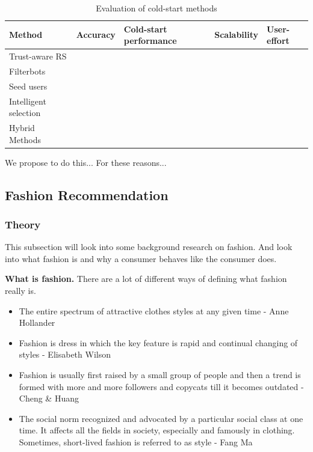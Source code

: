 \begin{table}[H]
    \centering
    \begin{tabular}{|l|l|l|l|l|}
    \hline
	Method & Accuracy & Cold-start performance & Scalability & User-effort \\ \hline
	Trust-aware RS & & & \\ \hline
	Filterbots & & & \\ \hline
	Seed users & & & \\ \hline
	Intelligent selection & & & \\ \hline
	Hybrid Methods & & & \\ \hline
    \end{tabular}
    \label{table:evaluationcoldstart}
    \caption [Evaluation of cold-start methods]{Evaluation of cold-start methods}
\end{table}

We propose to do this...
For these reasons...

\subsection{Fashion Recommendation}


\subsubsection{Theory}
This subsection will look into some background research on fashion.
And look into what fashion is and why a consumer behaves like the consumer does.

\textbf{What is fashion.}
There are a lot of different ways of defining what fashion really is.

\begin{itemize}
    \item The entire spectrum of attractive clothes styles at any given time - Anne Hollander
    \item Fashion is dress in which the key feature is rapid and continual changing of styles - Elisabeth Wilson
    \item Fashion is usually first raised by a small group of people and then a trend is formed with more and more followers and copycats till it becomes outdated - Cheng \& Huang
    \item The social norm recognized and advocated by a particular social class at one
    time. It affects all the fields in society, especially and famously in
    clothing. Sometimes, short-lived fashion is referred to as style - Fang Ma \cite{Fang2012}
\end{itemize}

